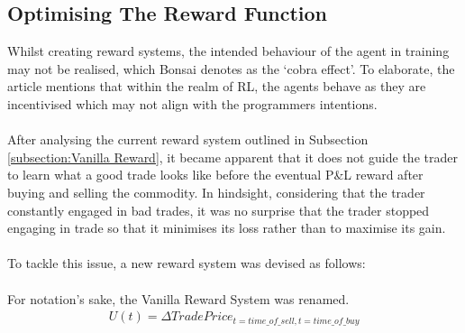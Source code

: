 \documentclass[ %
                    author={Ashwinder Khurana},
                supervisor={Prof Dave Cliff},
                    degree={MEng},
                     title={The Deeply Reinforced Trader},
                  subtitle={},
                      type={enterprise},
                      year={2020} ]{dissertation}
\begin{document}
{\subsection{Optimising The Reward Function}
\label{subsection:Optimising The Reward Function} 
Whilst creating reward systems, the intended behaviour of the agent in training may not be realised, which Bonsai denotes as the \enquote*{cobra effect}\cite{https://medium.com/@BonsaiAI/deep-reinforcement-learning-models-tips-tricks-for-writing-reward-functions-a84fe525e8e0}. To elaborate, the article mentions that within the realm of RL, the agents behave as they are incentivised which may not align with the programmers intentions. 
\\
\\
After analysing the current reward system outlined in Subsection \ref{subsection:Vanilla Reward}, it became apparent that it does not guide the trader to learn what a good trade looks like before the eventual P\&L reward after buying and selling the commodity. In hindsight, considering that the trader constantly engaged in bad trades, it was no surprise that the trader stopped engaging in trade so that it minimises its loss rather than to maximise its gain. 
\\
\\
To tackle this issue, a new reward system was devised as follows:
\\
\\
For notation's sake, the Vanilla Reward System was renamed.
\begin{equation}
\label{Vanilla Reward}
\begin{split}
U(t) = \Delta TradePrice_{t=time\_of\_ sell, t=time\_of\_buy}
\end{split}
\end{equation}

}
\end{document}
